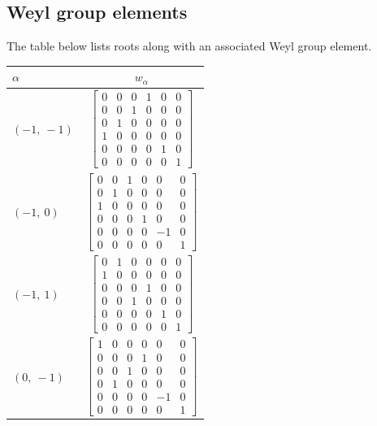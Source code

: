 \documentclass[11pt]{article}
\newcommand{\noi}{\noindent}
\theoremstyle{definition}
\begin{document}
\subsection{Weyl group elements}

\noi The table below lists roots along with an associated Weyl group element.

\bigskip

\noi \noindent \begin{longtable}{|l|c|}
    \hline
    $\alpha$ & $w_\alpha$ \\
    \hline
    \endhead
    $\left( -1, \  -1\right)$ & ${\left[\begin{matrix}0 & 0 & 0 & 1 & 0 & 0\\0 & 0 & 1 & 0 & 0 & 0\\0 & 1 & 0 & 0 & 0 & 0\\1 & 0 & 0 & 0 & 0 & 0\\0 & 0 & 0 & 0 & 1 & 0\\0 & 0 & 0 & 0 & 0 & 1\end{matrix}\right]}$ \\
    \hline
    $\left( -1, \  0\right)$ & ${\left[\begin{matrix}0 & 0 & 1 & 0 & 0 & 0\\0 & 1 & 0 & 0 & 0 & 0\\1 & 0 & 0 & 0 & 0 & 0\\0 & 0 & 0 & 1 & 0 & 0\\0 & 0 & 0 & 0 & -1 & 0\\0 & 0 & 0 & 0 & 0 & 1\end{matrix}\right]}$ \\
    \hline
    $\left( -1, \  1\right)$ & ${\left[\begin{matrix}0 & 1 & 0 & 0 & 0 & 0\\1 & 0 & 0 & 0 & 0 & 0\\0 & 0 & 0 & 1 & 0 & 0\\0 & 0 & 1 & 0 & 0 & 0\\0 & 0 & 0 & 0 & 1 & 0\\0 & 0 & 0 & 0 & 0 & 1\end{matrix}\right]}$ \\
    \hline
    $\left( 0, \  -1\right)$ & ${\left[\begin{matrix}1 & 0 & 0 & 0 & 0 & 0\\0 & 0 & 0 & 1 & 0 & 0\\0 & 0 & 1 & 0 & 0 & 0\\0 & 1 & 0 & 0 & 0 & 0\\0 & 0 & 0 & 0 & -1 & 0\\0 & 0 & 0 & 0 & 0 & 1\end{matrix}\right]}$ \\

\end{longtable}
\end{document}
